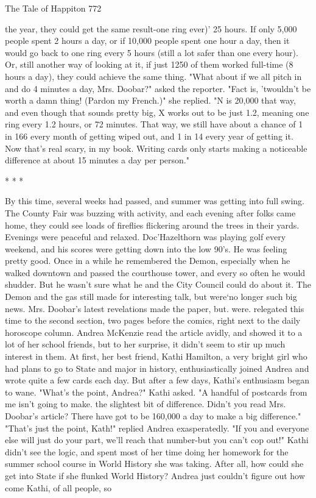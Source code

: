 The Tale of Happiton                                                                 772

the year, they could get the same result-one ring ever)' 25 hours. If only 5,000 people
spent 2 hours a day, or if 10,000 people spent one hour a day, then it would go back to
one ring every 5 hours (still a lot safer than one every hour). Or, still another way of
looking at it, if just 1250 of them worked full-time (8 hours a day), they could achieve
the same thing.
        "What about if we all pitch in and do 4 minutes a day, Mrs. Doobar?" asked
the reporter.
        "Fact is, 'twouldn't be worth a damn thing! (Pardon my French.)" she replied.
"N is 20,000 that way, and even though that sounds pretty big, X works out to be just
1.2, meaning one ring every 1.2 hours, or 72 minutes. That way, we still have about a
chance of 1 in 166 every month of getting wiped out, and 1 in 14 every year of getting
it. Now that's real scary, in my book. Writing cards only starts making a noticeable
difference at about 15 minutes a day per person."

                                       *   *   *

        By this time, several weeks had passed, and summer was getting into full
swing. The County Fair was buzzing with activity, and each evening after folks came
home, they could see loads of fireflies flickering around the trees in their yards.
Evenings were peaceful and relaxed. Doc'Hazelthorn was playing golf every
weekend, and his scores were getting down into the low 90's. He was feeling pretty
good. Once in a while he remembered the Demon, especially when he walked
downtown and passed the courthouse tower, and every so often he would shudder.
But he wasn't sure what he and the City Council could do about it.
        The Demon and the gas still made for interesting talk, but were`no longer such
big news. Mrs. Doobar's latest revelations made the paper, but. were. relegated this
time to the second section, two pages before the comics, right next to the daily
horoscope column. Andrea McKenzie read the article avidly, and showed it to a lot of
her school friends, but to her surprise, it didn't seem to stir up much interest in them.
At first, her best friend, Kathi Hamilton, a very bright girl who had plans to go to
State and major in history, enthusiastically joined Andrea and wrote quite a few cards
each day. But after a few days, Kathi's enthusiasm began to wane.
        "What's the point, Andrea?" Kathi asked. "A handful of postcards from me
isn't going to make. the slightest bit of difference. Didn't you read Mrs. Doobar's
article? There have got to be 160,000 a day to make a big difference."
        "That's just the point, Kath!" replied Andrea exasperatedly. "If you and
everyone else will just do your part, we'll reach that number-but you can't cop out!"
Kathi didn't see the logic, and spent most of her time doing her homework for the
summer school course in World History she was taking. After all, how could she get
into State if she flunked World History?
        Andrea just couldn't figure out how come Kathi, of all people, so




